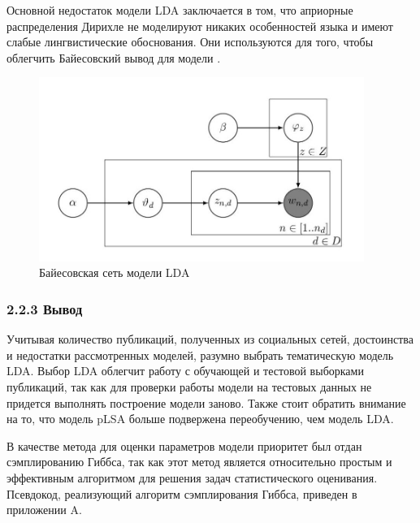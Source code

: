 \documentclass[a4paper]{report}
\begin{document}
	Основной недостаток модели LDA заключается в том, что априорные распределения Дирихле не моделируют никаких особенностей языка и имеют слабые лингвистические обоснования. Они используются для того, чтобы облегчить Байесовский вывод для модели \cite{bib:Voron1}.
	
	
	
	\begin{figure}
		\centering
		\includegraphics[width=400px]
		{imgs/LDA.jpg}
		\caption{Байесовская сеть модели LDA}
		\label{fig:lda}
	\end{figure} 
	
	
	
	
	\subsubsection{2.2.3 Вывод}
	Учитывая количество публикаций, полученных из социальных сетей, достоинства и недостатки рассмотренных моделей, разумно выбрать тематическую модель LDA. Выбор LDA облегчит работу с обучающей и тестовой выборками публикаций, так как для проверки работы модели на тестовых данных не придется выполнять построение модели заново.  Также стоит обратить внимание на то, что модель pLSA больше подвержена переобучению, чем модель LDA.
	
	В качестве метода для оценки параметров модели приоритет был отдан сэмплированию Гиббса,  так как этот метод является относительно простым и эффективным алгоритмом для решения задач статистического оценивания. Псевдокод, реализующий алгоритм сэмплирования Гиббса, приведен в приложении A.
	


	
	
\end{document}
